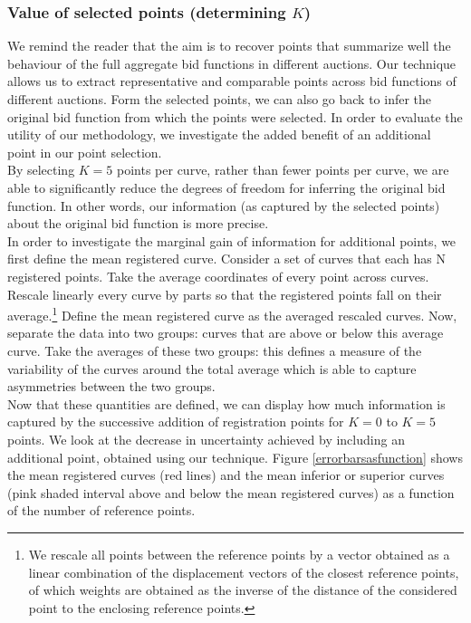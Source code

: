 \subsubsection{Value of selected points (determining $K$)
}
We remind the reader that the aim is to recover points that summarize well the behaviour of the full aggregate bid functions in different auctions. 
Our technique allows us to extract representative and comparable points across bid functions of different auctions. Form the selected points, we can also go back to infer the original bid function from which the points were selected. In order to evaluate the utility of our methodology, we investigate the added benefit of an additional point in our point selection. \\

By selecting $K=5$ points per curve, rather than fewer points per curve, we are able to significantly reduce the degrees of freedom for inferring the original bid function. In other words, our information (as captured by the selected points) about the original bid function is more precise. \\

In order to investigate the marginal gain of information for additional points, we first define the mean registered curve. Consider a set of curves that each has N registered points. Take the average coordinates of every point across curves. Rescale linearly every curve by parts so that the registered points fall on their average.\footnote{We rescale all points between the reference points by a vector obtained as a linear combination of the displacement vectors of the closest reference points, of which weights are obtained as the inverse of the distance of the considered point to the enclosing reference points.} Define the mean registered curve as the averaged rescaled curves. Now, separate the data into two groups: curves that are above or below this average curve. Take the averages of these two groups: this defines a measure of the variability of the curves around the total average which is able to capture asymmetries between the two groups.\\

Now that these quantities are defined, we can display how much information is captured by the successive addition of registration points for $K=0$ to $K=5$ points. We look at the decrease in uncertainty achieved by including an additional point, obtained using our technique. Figure \ref{errorbarsasfunction} shows the mean registered curves (red lines) and the mean inferior or superior curves (pink shaded interval above and below the mean registered curves) as a function of the number of reference points. \\

